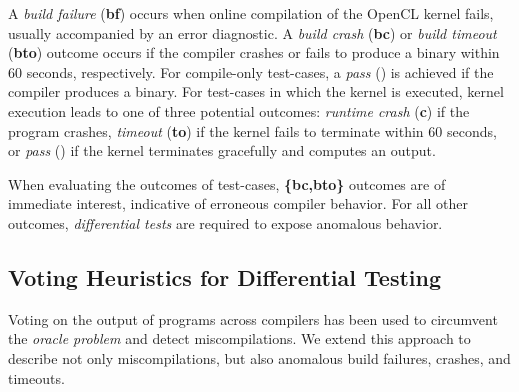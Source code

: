 A \emph{build failure} (\textbf{bf}) occurs when online compilation of the OpenCL kernel fails, usually accompanied by an error diagnostic. A \emph{build crash} (\textbf{bc}) or \emph{build timeout} (\textbf{bto}) outcome occurs if the compiler crashes or fails to produce a binary within 60 seconds, respectively. For compile-only test-cases, a \emph{pass} (\textbf{\cmark}) is achieved if the compiler produces a binary. For test-cases in which the kernel is executed, kernel execution leads to one of three potential outcomes: \emph{runtime crash} (\textbf{c}) if the program crashes, \emph{timeout} (\textbf{to}) if the kernel fails to terminate within 60 seconds, or \emph{pass} (\textbf{\cmark}) if the kernel terminates gracefully and computes an output.
%

When evaluating the outcomes of test-cases, \textbf{\{bc,bto\}} outcomes are of immediate interest, indicative of erroneous compiler behavior. For all other outcomes, \emph{differential tests} are required to expose anomalous behavior.


\subsection{Voting Heuristics for Differential Testing}

Voting on the output of programs across compilers has been used to circumvent the \emph{oracle problem} and detect miscompilations.
We extend this approach to describe not only miscompilations, but also anomalous build failures, crashes, and timeouts.

